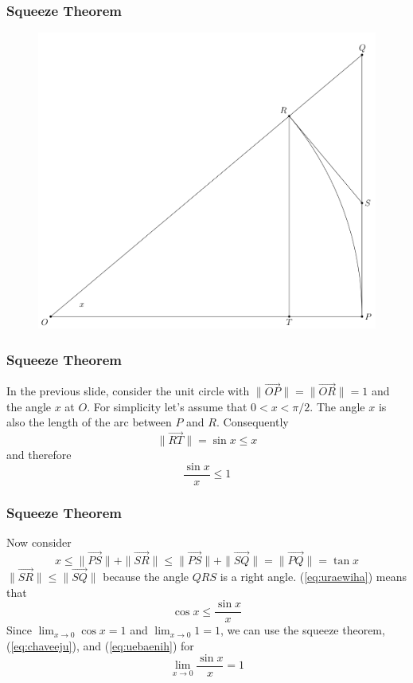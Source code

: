 \documentclass[xcolor=dvipsnames]{beamer}
\begin{document}
\begin{frame}
  \frametitle{Squeeze Theorem}
\begin{figure}[h]
\includegraphics[scale=.24]{./diagrams/limsinxoverx.png}
\end{figure}
\end{frame}

\begin{frame}
  \frametitle{Squeeze Theorem}
  In the previous slide, consider the unit circle with
  $\|\vec{OP}\|=\|\vec{OR}\|=1$ and the angle $x$ at $O$. For simplicity let's
  assume that $0<x<\pi/2$. The angle $x$ is also the length of the arc
  between $P$ and $R$. Consequently
  \begin{equation}
    \label{eq:iufoobue}
\|\vec{RT}\|=\sin{}x\leq{}x    
  \end{equation}
  and therefore
  \begin{equation}
    \label{eq:chaveeju}
    \frac{\sin{}x}{x}\leq{}1
  \end{equation}
\end{frame}

\begin{frame}
  \frametitle{Squeeze Theorem}
  Now consider
  \begin{equation}
    \label{eq:uraewiha}
    x\leq\|\vec{PS}\|+\|\vec{SR}\|\leq\|\vec{PS}\|+\|\vec{SQ}\|=\|\vec{PQ}\|=\tan{}x
  \end{equation}
$\|\vec{SR}\|\leq\|\vec{SQ}\|$ because the angle $QRS$ is a right angle.
(\ref{eq:uraewiha}) means that
\begin{equation}
  \label{eq:uebaenih}
  \cos{}x\leq\frac{\sin{}x}{x}
\end{equation}
Since $\lim_{x\rightarrow{}0}\cos{}x=1$ and $\lim_{x\rightarrow{}0}1=1$, we can use the squeeze
theorem, (\ref{eq:chaveeju}), and (\ref{eq:uebaenih}) for
\begin{equation}
  \label{eq:guabighe}
  \lim_{x\rightarrow{}0}\frac{\sin{}x}{x}=1
\end{equation}
\end{frame}
\end{document}
